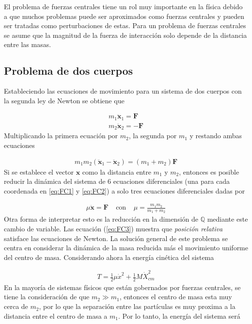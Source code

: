 El problema de fuerzas centrales tiene un rol muy importante en la física debido a que muchos problemas puede ser aproximados como fuerzas centrales y pueden ser tratadas como perturbaciones de estas. Para un problema de fuerzas centrales se asume que la magnitud de la fuerza de interacción solo depende de la distancia entre las masas.

\subsection[short]{Problema de dos cuerpos}
Estableciendo las ecuaciones de movimiento para un sistema de dos cuerpos con la segunda ley de Newton se obtiene que 

\begin{gather}
    \label{eq:FC1}m_1\ddot{\mathbf{x}}_1 = \mathbf{F}\\
    \label{eq:FC2}m_2\ddot{\mathbf{x}}_2 = -\mathbf{F}
\end{gather}
Multiplicando la primera ecuación por $m_2$, la segunda por $m_1$ y restando ambas ecuaciones 

\begin{gather*}
    m_1m_2 (\ddot{\mathbf{x}}_1 - \ddot{\mathbf{x}}_2) = (m_1 + m_2)\mathbf{F}
\end{gather*}
Si se establece el vector $\mathbf{x}$ como la distancia entre $m_1$ y $m_2$, entonces es posible reducir la dinámica del sistema de $6$ ecuaciones diferenciales (una para cada coordenada en \ref*{eq:FC1} y \ref*{eq:FC2}) a solo tres ecuaciones diferenciales dadas por

\begin{gather}
    \label{eq:FC3}\mu \ddot{\mathbf{x}} = \mathbf{F} \;\;\;\; \text{con} \;\;\;\; \mu = \frac{m_1m_2}{m_1 + m_2}
\end{gather}
Otra forma de interpretar esto es la reducción en la dimensión de $\mathbb{Q}$ mediante este cambio de variable. Las ecuación (\ref*{eq:FC3}) muestra que \textit{posición relativa} satisface las ecuaciones de Newton. La solución general de este problema se centra en considerar la dinámica de la masa reducida más el movimiento uniforme del centro de masa. Considerando ahora la energía cinética del sistema

\begin{gather*}
    T = \frac{1}{2}\mu\dot{x}^2 + \frac{1}{2}M\dot{X}_{cm}^2
\end{gather*}
En la mayoría de sistemas físicos que están gobernados por fuerzas centrales, se tiene la consideración de que $m_2 \gg m_1$, entonces el centro de masa esta muy cerca de $m_2$, por lo que la separación entre las partículas es muy proxima a la distancia entre el centro de masa a $m_1$. Por lo tanto, la energía del sistema será 

